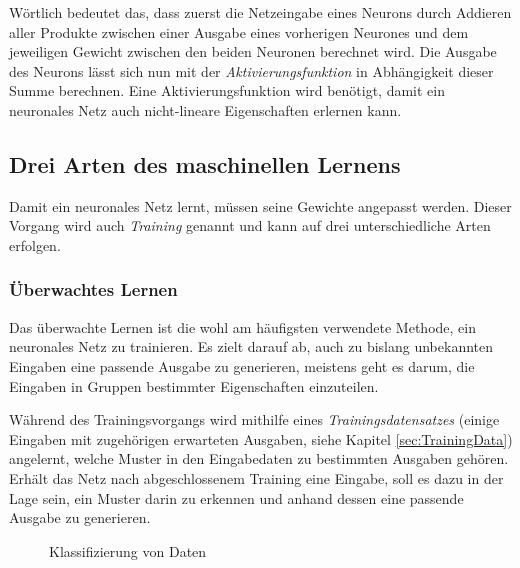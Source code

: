 \documentclass[12pt,a4]{article}
\begin{document}
Wörtlich bedeutet das, dass zuerst die Netzeingabe eines Neurons durch Addieren aller Produkte zwischen einer Ausgabe eines vorherigen Neurones und dem jeweiligen Gewicht zwischen den beiden Neuronen berechnet wird. Die Ausgabe des Neurons lässt sich nun mit der \textit{Aktivierungsfunktion} in Abhängigkeit dieser Summe berechnen. Eine Aktivierungsfunktion wird benötigt, damit ein neuronales Netz auch nicht-lineare Eigenschaften erlernen kann.

\subsection{Drei Arten des maschinellen Lernens \cite{PythonMachineLearningChapter1}}\label{sec:MachineLearningTypes}
Damit ein neuronales Netz lernt, müssen seine Gewichte angepasst werden. Dieser Vorgang wird auch \textit{Training} genannt und kann auf drei unterschiedliche Arten erfolgen.

\subsubsection{Überwachtes Lernen}\label{sec:SupervisedLearning}
Das überwachte Lernen ist die wohl am häufigsten verwendete Methode, ein neuronales Netz zu trainieren. Es zielt darauf ab, auch zu bislang unbekannten Eingaben eine passende Ausgabe zu generieren, meistens geht es darum, die Eingaben in Gruppen bestimmter Eigenschaften einzuteilen. 

Während des Trainingsvorgangs wird mithilfe eines \textit{Trainingsdatensatzes} (einige Eingaben mit zugehörigen erwarteten Ausgaben, siehe Kapitel \ref{sec:TrainingData}) angelernt, welche Muster in den Eingabedaten zu bestimmten Ausgaben gehören. Erhält das Netz nach abgeschlossenem Training eine Eingabe, soll es dazu in der Lage sein, ein Muster darin zu erkennen und anhand dessen eine passende Ausgabe zu generieren.

\begin{figure}[!h]
\centering
{}
\caption{Klassifizierung von Daten}
\label{fig:SupervisedLearning}
\end{figure}
\end{document}
